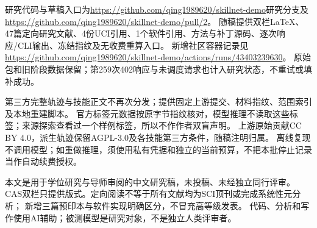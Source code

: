 研究代码与草稿入口为\url{https://github.com/qing1989620/skillnet-demo}研究分支及
\url{https://github.com/qing1989620/skillnet-demo/pull/2}。
随稿提供双栏LaTeX、47篇定向研究文献、4份UCI引用、1个软件引用、方法与补丁源码、逐次响应/CLI输出、冻结指纹及无收费重算入口。
新增社区容器记录见\url{https://github.com/qing1989620/skillnet-demo/actions/runs/43403239630}。
原始包和旧阶段数据保留；第259次402响应与未调度请求也计入研究状态，不重试或填补成功。

第三方完整轨迹与技能正文不再次分发；提供固定上游提交、材料指纹、范围索引及本地重建脚本。
官方标签元数据按原字节指纹核对，模型推理不读取这些标签；来源探索查看过一个样例标签，所以不作作者双盲声明。
上游原始贡献CC BY 4.0，派生轨迹保留AGPL-3.0及各技能第三方条件，随稿注明归属。
离线复现不调用模型；如重做推理，须使用私有凭据和独立的当前预算，不把本批停止记录当作自动续费授权。

本文是用于学位研究与导师审阅的中文研究稿，未投稿、未经独立同行评审。
CAS双栏只提供版式。定向阅读不等于所有文献均为SCI顶刊或完成系统性元分析；
新增三篇预印本与软件实现明确区分，不冒充高等级发表。
代码、分析和写作使用AI辅助；被测模型是研究对象，不是独立人类评审者。
